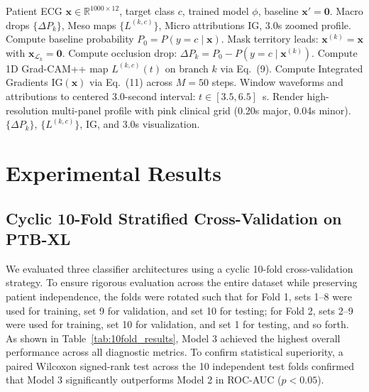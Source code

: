 \documentclass[5p,twocolumn,10pt]{elsarticle}
\begin{document}
\begin{algorithm}[t]
\caption{Multi-Scale Anatomical Attribution Inference}
\label{alg:xai_inference}
\begin{algorithmic}[1]
\REQUIRE Patient ECG $\mathbf{x} \in \mathbb{R}^{1000 \times 12}$, target class $c$, trained model $\phi$, baseline $\mathbf{x}' = \mathbf{0}$.
\ENSURE Macro drops $\{\Delta P_k\}$, Meso maps $\{L^{(k, c)}\}$, Micro attributions $\text{IG}$, 3.0s zoomed profile.
\STATE Compute baseline probability $P_0 = P(y = c \mid \mathbf{x})$.
    \STATE Mask territory leads: $\mathbf{x}^{(k)} = \mathbf{x}$ with $\mathbf{x}_{\mathcal{L}_k} = \mathbf{0}$.
    \STATE Compute occlusion drop: $\Delta P_k = P_0 - P(y = c \mid \mathbf{x}^{(k)})$.
    \STATE Compute 1D Grad-CAM++ map $L^{(k, c)}(t)$ on branch $k$ via Eq.~(9).
\ENDFOR
\STATE Compute Integrated Gradients $\text{IG}(\mathbf{x})$ via Eq.~(11) across $M=50$ steps.
\STATE Window waveforms and attributions to centered 3.0-second interval: $t \in [3.5, 6.5]$~s.
\STATE Render high-resolution multi-panel profile with pink clinical grid (0.20s major, 0.04s minor).
\RETURN $\{\Delta P_k\}$, $\{L^{(k, c)}\}$, $\text{IG}$, and 3.0s visualization.
\end{algorithmic}
\end{algorithm}


\section{Experimental Results}
\label{sec:results}

\subsection{Cyclic 10-Fold Stratified Cross-Validation on PTB-XL}
We evaluated three classifier architectures using a cyclic 10-fold cross-validation strategy. To ensure rigorous evaluation across the entire dataset while preserving patient independence, the folds were rotated such that for Fold 1, sets 1--8 were used for training, set 9 for validation, and set 10 for testing; for Fold 2, sets 2--9 were used for training, set 10 for validation, and set 1 for testing, and so forth. As shown in Table~\ref{tab:10fold_results}, Model 3 achieved the highest overall performance across all diagnostic metrics. To confirm statistical superiority, a paired Wilcoxon signed-rank test across the 10 independent test folds confirmed that Model 3 significantly outperforms Model 2 in ROC-AUC ($p < 0.05$).
\end{document}
